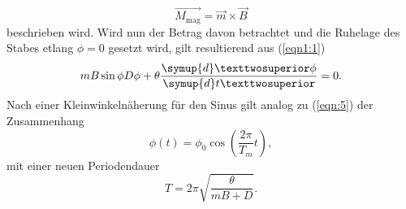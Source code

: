 \begin{equation}
  \vec{M_{\text{mag}}} = \vec{m} \times \vec{B} \label{eqn:10}
\end{equation}
beschrieben wird.
Wird nun der Betrag davon betrachtet und die Ruhelage des Stabes etlang $\phi = 0$ gesetzt wird, gilt resultierend aus (\ref{eqn1:1})
\begin{equation}
      mB\sin{\phi} D \phi + \theta \frac{\symup{d}²\phi}{\symup{d}t²} = 0.
\end{equation}
Nach einer Kleinwinkelnäherung für den Sinus gilt analog zu (\ref{eqn:5}) der Zusammenhang
\begin{equation}
  \phi (t) = \phi_0\cos\left(\frac{2\pi}{T_m}t\right), \label{eqn:11}
\end{equation}
mit einer neuen Periodendauer
\begin{equation}
  T = 2\pi\sqrt{\frac{\theta}{mB+D}}. \label{eqn:12}
\end{equation}
